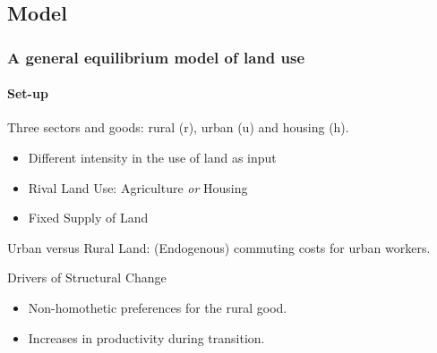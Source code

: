 \documentclass[aspectratio=169]{beamer}
\begin{document}
\subsection{Model}
\begin{frame}
\frametitle{A general equilibrium model of land use}
\framesubtitle{Set-up}

\begin{midi}
\item Three sectors and goods: rural (r), urban (u) and housing (h).
\begin{itemize}
	\item Different intensity in the use of land as input
	\item Rival Land Use: Agriculture \emph{or} Housing
	\item Fixed Supply of Land
\end{itemize}

\item Urban versus Rural Land: (Endogenous) commuting costs for urban workers.

\item Drivers of Structural Change
\begin{itemize}
	\item Non-homothetic preferences for the rural good.
	\item Increases in productivity during transition.
\end{itemize}
\end{midi}
\end{frame}

\end{document}

